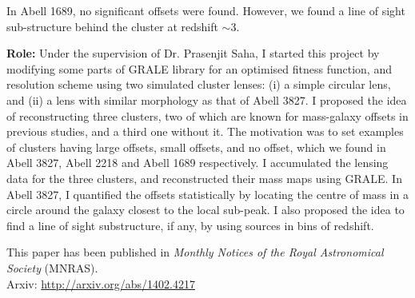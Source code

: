In Abell 1689, no significant offsets were found. However,  
we found a line of sight sub-structure behind the cluster at
redshift $\sim 3$. 

{\bf Role:} Under the supervision of Dr. Prasenjit Saha,
I started this project by modifying some parts of 
GRALE library for an optimised fitness function, and resolution scheme
using two simulated cluster lenses: (i) a simple circular lens, and 
(ii) a lens with similar morphology as that of Abell 3827. I proposed the
idea of reconstructing three clusters, two of which are known for
mass-galaxy offsets in previous studies, 
and a third one without it. The motivation was to set examples 
of clusters having large offsets, small offsets, and no offset, which we
found in Abell 3827, Abell 2218 and Abell 1689 respectively. I accumulated
the lensing data for the three clusters, and reconstructed their mass 
maps using GRALE. In Abell 3827, I quantified the offsets statistically
by locating the centre of mass in a circle around the galaxy closest to 
the local sub-peak. I also proposed the idea to find a line of sight
substructure, if any, by using sources in bins of redshift.


This paper has been published in {\it Monthly Notices of the Royal Astronomical
Society} (MNRAS). 
\\
Arxiv: \url{http://arxiv.org/abs/1402.4217}


\clearpage
